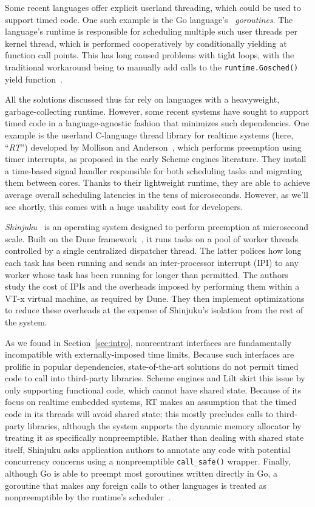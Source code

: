 Some recent languages offer explicit userland threading, which could be used to
support timed
code.  One such example is the Go language's~\cite{www-golang} \textit{goroutines}.
The language's runtime is responsible for scheduling multiple such user
threads per kernel thread, which is performed cooperatively by conditionally yielding
at function call points.  This has long caused problems with tight loops, with the
traditional workaround being to manually add calls to the \texttt{runtime.Gosched()}
yield function~\cite{www-golang-tightloop}.

All the solutions discussed thus far rely on languages with a heavyweight,
garbage-collecting runtime.  However, some recent systems have sought
to support timed code in a language-agnostic fashion that minimizes such
dependencies.  One example is the userland C-language thread library for realtime
systems (here, ``\textit{RT}'') developed by Mollison and
Anderson~\cite{mollison:rtas2013}, which performs
preemption using timer interrupts, as proposed in the early Scheme engines
literature.  They install a time-based signal handler responsible for both scheduling
tasks and migrating them between cores.  Thanks to their lightweight runtime, they
are able to achieve average overall scheduling latencies in the tens of microseconds.
However, as we'll see shortly, this comes with a huge usability cost for developers.

\textit{Shinjuku}~\cite{Kaffes:nsdi2019} is an operating system designed to perform
preemption at microsecond scale.  Built on the Dune framework~\cite{Belay:osdi2012},
it runs tasks on a pool of worker threads controlled by a single centralized
dispatcher thread.  The latter polices how long each task has been running and
sends an inter-processor interrupt (IPI) to any worker whose task has been running
for longer than permitted.  The authors study the cost of IPIs and the overheads
imposed by performing them within a VT-x virtual machine, as required by Dune.  They
then implement optimizations to reduce these overheads at the expense of Shinjuku's
isolation from the rest of the system.

As we found in Section~\ref{sec:intro}, nonreentrant interfaces are fundamentally
incompatible with externally-imposed time limits.  Because such interfaces are
prolific in popular dependencies, state-of-the-art solutions do not permit timed code
to call into third-party libraries.  Scheme engines and
Lilt skirt this issue by only supporting functional code, which cannot have shared
state.  Because of its focus on realtime embedded systems, RT makes an assumption
that the timed code in its threads will avoid shared state; this mostly precludes
calls to third-party libraries, although the system supports the dynamic memory
allocator by treating it as specifically nonpreemptible.  Rather than dealing with
shared state itself, Shinjuku asks application authors to annotate any code with
potential concurrency concerns using a nonpreemptible \texttt{call\_safe()} wrapper.
Finally, although Go is able to preempt most goroutines written directly in Go, a
goroutine that makes any foreign calls to other languages is treated as
nonpreemptible by the runtime's scheduler~\cite{www-golang-fficall}.

